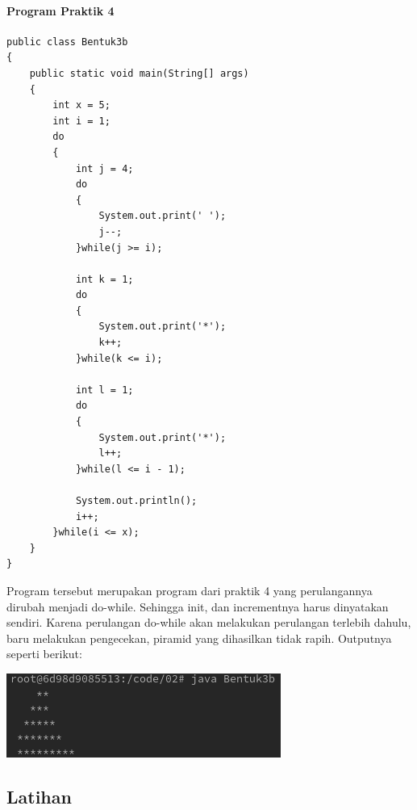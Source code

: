 \documentclass[a4paper,12pt]{article}
\begin{document}
\paragraph{Program Praktik 4}
\begin{center}
    \begin{lstlisting}
public class Bentuk3b
{
    public static void main(String[] args)
    {
        int x = 5;
        int i = 1;
        do 
        {
            int j = 4;
            do 
            {
                System.out.print(' ');
                j--;
            }while(j >= i);

            int k = 1;
            do 
            {
                System.out.print('*');
                k++;
            }while(k <= i);

            int l = 1;
            do 
            {
                System.out.print('*');
                l++;
            }while(l <= i - 1);

            System.out.println();
            i++;
        }while(i <= x);
    }
}
    \end{lstlisting}
\end{center}
Program tersebut merupakan program dari praktik 4 yang perulangannya dirubah menjadi do-while. Sehingga init, dan incrementnya harus dinyatakan sendiri. Karena perulangan do-while 
akan melakukan perulangan terlebih dahulu, baru melakukan pengecekan, piramid yang dihasilkan tidak rapih.
Outputnya seperti berikut:\\
\begin{center}
    \includegraphics[scale=.7]{10.png}
\end{center}

\newpage

\subsection{Latihan}
\end{document}
